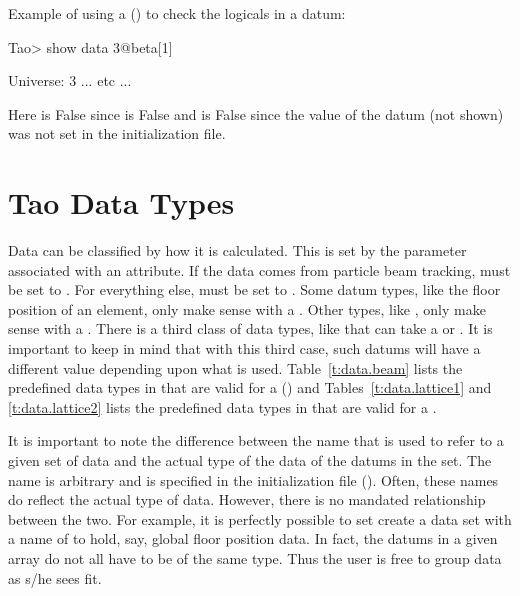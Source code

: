 Example of using a  () to check the logicals
in a datum:
\begin{example}
  Tao> show data 3@beta[1]

  Universe:   3
      ... etc ...
\end{example}
Here  is False since  is False and
 is False since the  value of the datum (not
shown) was not set in the \tao initialization file.

\section{Tao Data Types}
\label{s:data.types}

Data can be classified by how it is calculated. This is set by the
 parameter associated with an attribute. If the data
comes from particle beam tracking,  must be set to
. For everything else,  must be set to
. Some datum types, like the floor position of an
element, only make sense with a  . Other
types, like , only make sense with a 
. There is a third class of data types, like
 that can take a  or 
. It is important to keep in mind that with this third
case, such datums will have a different value depending upon what
 is used.  Table~\ref{t:data.beam} lists the
predefined data types in \tao that are valid for a 
 () and Tables~\ref{t:data.lattice1}
and \ref{t:data.lattice2} lists the predefined data types in \tao that
are valid for a  .

It is important to note the difference between the  name
that is used to refer to a given set of data and the actual type of
the data of the datums in the set. The  name is arbitrary
and is specified in the \tao initialization file
(). Often, these names do reflect the actual type of
data. However, there is no mandated relationship between the two. For example,
it is perfectly possible to set create a data set with a 
name of  to hold, say, global floor position data. In
fact, the datums in a given  array do not all have to be of the
same type. Thus the user is free to group data as s/he sees fit.

